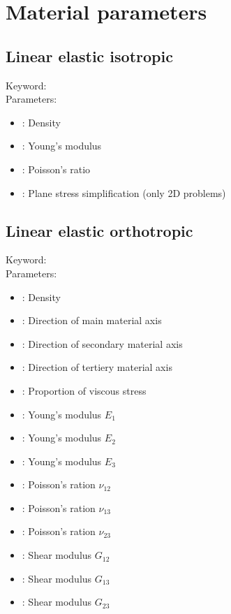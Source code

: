 \chapter{Material parameters}
\label{app:material-parameters}

\section{Linear elastic isotropic}

Keyword: \\

\noindent Parameters:
\begin{itemize}
\item {}: Density
\item {}: Young's modulus
\item {}: Poisson's ratio
\item {}: Plane stress simplification (only 2D problems)
\end{itemize}

\section{Linear elastic orthotropic}

Keyword: \\

\noindent Parameters:
\begin{itemize}
\item {}: Density
\item {}: Direction of main material axis
\item {}: Direction of secondary material axis
\item {}: Direction of tertiery material axis
\item {}: Proportion of viscous stress
\item {}: Young's modulus $E_1$
\item {}: Young's modulus $E_2$
\item {}: Young's modulus $E_3$
\item {}: Poisson's ration $\nu_{12}$
\item {}: Poisson's ration $\nu_{13}$
\item {}: Poisson's ration $\nu_{23}$
\item {}: Shear modulus $G_{12}$
\item {}: Shear modulus $G_{13}$
\item {}: Shear modulus $G_{23}$
\end{itemize}

